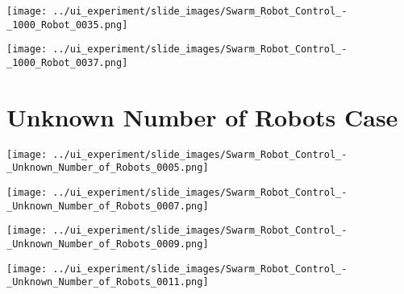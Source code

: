 \begin{minipage}{\linewidth}
	\centering	
	\begin{minipage}{0.42\linewidth}
		\texttt{[image: ../ui\_experiment/slide\_images/Swarm\_Robot\_Control\_-\_1000\_Robot\_0035.png]}
		\label{fig:sub1}
	\end{minipage}
	\hspace{0.05\linewidth}
	\begin{minipage}{0.42\linewidth}
		\texttt{[image: ../ui\_experiment/slide\_images/Swarm\_Robot\_Control\_-\_1000\_Robot\_0037.png]}
		\label{fig:sub2}
	\end{minipage}
	\label{fig:1000_robot_slides}
\end{minipage}

\section{Unknown Number of Robots Case}

\begin{minipage}{\linewidth}
	\centering
	\begin{minipage}{0.42\linewidth}
		\texttt{[image: ../ui\_experiment/slide\_images/Swarm\_Robot\_Control\_-\_Unknown\_Number\_of\_Robots\_0005.png]}
		\label{fig:sub1}
	\end{minipage}
	\hspace{0.05\linewidth}
	\begin{minipage}{0.42\linewidth}
		\texttt{[image: ../ui\_experiment/slide\_images/Swarm\_Robot\_Control\_-\_Unknown\_Number\_of\_Robots\_0007.png]}
		\label{fig:sub2}
	\end{minipage}
\end{minipage}

\begin{minipage}{\linewidth}
	\centering
	\begin{minipage}{0.42\linewidth}
		\texttt{[image: ../ui\_experiment/slide\_images/Swarm\_Robot\_Control\_-\_Unknown\_Number\_of\_Robots\_0009.png]}
		\label{fig:sub1}
	\end{minipage}
	\hspace{0.05\linewidth}
	\begin{minipage}{0.42\linewidth}
		\texttt{[image: ../ui\_experiment/slide\_images/Swarm\_Robot\_Control\_-\_Unknown\_Number\_of\_Robots\_0011.png]}
		\label{fig:sub2}
	\end{minipage}
\end{minipage}

